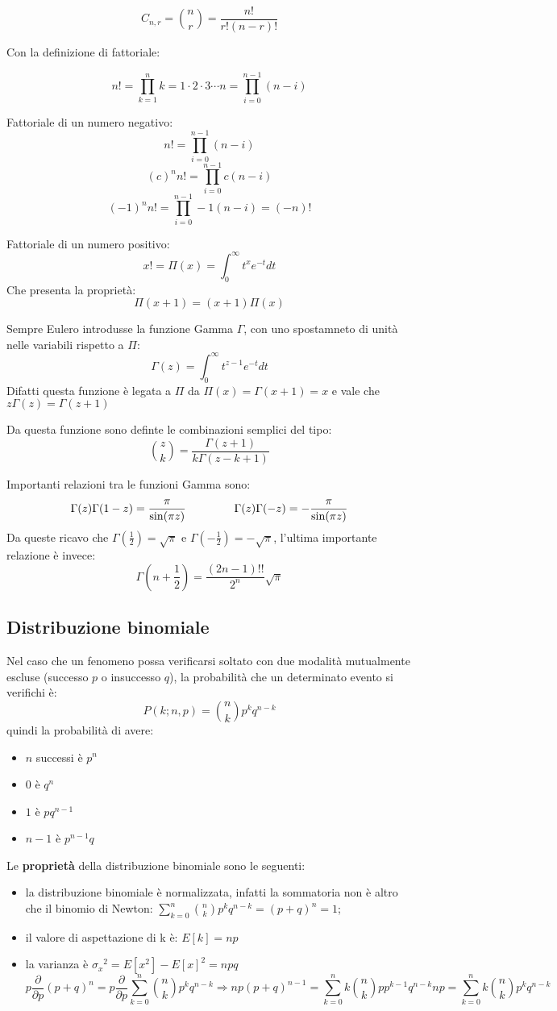 \documentclass{article}
\begin{document}
\[
C_{n,r} = \binom{n}{r} = \frac{n!}{r!(n - r)!}
\]

Con la definizione di fattoriale:

\[
n! = \prod_{k=1}^{n} k = 1 \cdot 2 \cdot 3 \cdots n = \prod_{i=0}^{n-1} (n - i)
\]

Fattoriale di un numero negativo:
\[
n!=\prod_{i=0}^{n-1}(n-i)
\]
\[
{(c)}^n n!=\prod_{i=0}^{n-1}c(n-i)
\]
\[
{(-1)}^n n!=\prod_{i=0}^{n-1}-1(n-i)=(-n)!
\]

Fattoriale di un numero positivo:
\[
x! = \Pi(x)=\int_{0}^{\infty}t^{x}e^{-t}dt
\]
Che presenta la proprietà:
\[
\Pi(x+1)=(x+1)\Pi(x)
\]

Sempre Eulero introdusse la funzione Gamma $\Gamma$, con uno spostamneto di unità nelle variabili rispetto a $\Pi$:
\[
\Gamma(z)=\int_{0}^{\infty}t^{z-1}e^{-t}dt
\]
Difatti questa funzione è legata a $\Pi$ da $\Pi(x)=\Gamma(x+1)=x\!$ e vale che $z\Gamma(z)=\Gamma(z+1)$

Da questa funzione sono definte le combinazioni semplici del tipo:
\[
\binom{z}{k}=\frac{\Gamma(z+1)}{k\! \Gamma(z-k+1)}
\]

Importanti relazioni tra le funzioni Gamma sono:
\[
\Gamma(z)\Gamma(1-z)=\frac{\pi}{\sin(\pi z)} \hspace{1.5cm} \Gamma(z)\Gamma(-z)=-\frac{\pi}{\sin(\pi z)}
\]
Da queste ricavo che $\Gamma(\frac{1}{2})=\sqrt{\pi}$ e $\Gamma(-\frac{1}{2})=-\sqrt{\pi}$, l'ultima importante relazione è invece:
\[
\Gamma(n+\frac{1}{2})=\frac{(2n-1)!!}{2^n}\sqrt{\pi}
\]


\subsection{Distribuzione binomiale}

Nel caso che un fenomeno possa verificarsi soltato con due modalità mutualmente escluse (successo $p$ o insuccesso $q$), la probabilità che un determinato evento si verifichi è:
\[
P(k;n,p)=\binom{n}{k}p^k q^{n-k} 
\] 
quindi la probabilità di avere:
\begin{itemize}[itemsep=0.1em]
 \item $n$ successi è  $p^n$ 
 \item $0$ è $q^n$  
 \item $1$ è $pq^{n-1}$
 \item $n-1$ è $p^{n-1}q$
\end{itemize}


Le \textbf{proprietà} della distribuzione binomiale sono le seguenti:
\begin{itemize}
    \item la distribuzione binomiale è normalizzata, infatti la sommatoria non è altro che il binomio di Newton: $\displaystyle \sum_{k=0}^{n} \binom {n}{k}p^kq^{n-k}=(p+q)^n =1$;
    \item il valore di aspettazione di k è: $E[k]=np$
    \item la varianza è ${\sigma_x}^2=E[x^2]-{E[x]}^2=npq$
    \[
p \frac{\partial}{\partial p} (p + q)^n
= p \frac{\partial}{\partial p} \sum_{k=0}^{n} \binom{n}{k} p^k q^{n-k}
\Rightarrow np(p + q)^{n-1}
= \sum_{k=0}^{n} k \binom{n}{k} {p}p^{k-1} q^{n-k}
np = \sum_{k=0}^{n} k \binom{n}{k} p^k q^{n-k}
\]
\end{itemize}
\end{document}
